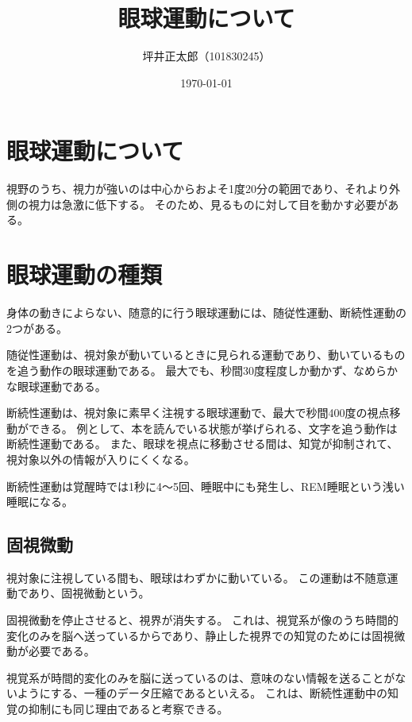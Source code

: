 \documentclass[a4paper,10pt]{jsarticle}
\begin{document}
\title{眼球運動について}
\author{坪井正太郎（101830245）}
\date{\today}
\maketitle
\section{眼球運動について}
視野のうち、視力が強いのは中心からおよそ1度20分の範囲であり、それより外側の視力は急激に低下する。
そのため、見るものに対して目を動かす必要がある。

\section{眼球運動の種類}
身体の動きによらない、随意的に行う眼球運動には、随従性運動、断続性運動の2つがある。

随従性運動は、視対象が動いているときに見られる運動であり、動いているものを追う動作の眼球運動である。
最大でも、秒間30度程度しか動かず、なめらかな眼球運動である。

断続性運動は、視対象に素早く注視する眼球運動で、最大で秒間400度の視点移動ができる。
例として、本を読んでいる状態が挙げられる、文字を追う動作は断続性運動である。
また、眼球を視点に移動させる間は、知覚が抑制されて、視対象以外の情報が入りにくくなる。

断続性運動は覚醒時では1秒に4～5回、睡眠中にも発生し、REM睡眠という浅い睡眠になる。

\subsection*{固視微動}
視対象に注視している間も、眼球はわずかに動いている。
この運動は不随意運動であり、固視微動という。

固視微動を停止させると、視界が消失する。
これは、視覚系が像のうち時間的変化のみを脳へ送っているからであり、静止した視界での知覚のためには固視微動が必要である。

視覚系が時間的変化のみを脳に送っているのは、意味のない情報を送ることがないようにする、一種のデータ圧縮であるといえる。
これは、断続性運動中の知覚の抑制にも同じ理由であると考察できる。
\end{document}

